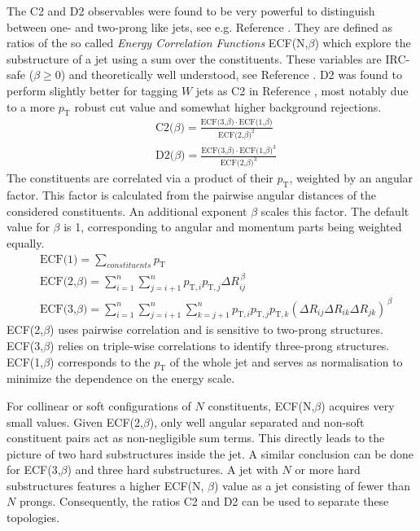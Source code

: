 The C2 and D2 observables were found to be very powerful to distinguish between one- and two-prong like jets, see e.g. Reference \cite{bib:power_counting}. They are defined as ratios of the so called \textit{Energy Correlation Functions} ECF(N,$\beta$) which explore the substructure of a jet using a sum over the constituents. These variables are IRC-safe ($\beta\ge0$) and theoretically well understood, see Reference \cite{bib:analytic_ECF}. D2 was found to perform slightly better for tagging $W$ jets as C2 in Reference \cite{bib:w_tagging}, most notably due to a more $p_{\mathrm{T}}$ robust cut value and somewhat higher background rejections. 
\begin{equation}
\begin{aligned}
 & \text{C2($\beta$)} ={} \frac{\text{ECF(3,$\beta$)}\cdot\text{ECF(1,$\beta$)}}{\text{ECF(2,$\beta$)}^2} \\ 
 & \text{D2($\beta$)} ={} \frac{\text{ECF(3,$\beta$)}\cdot\text{ECF(1,$\beta$)}^3}{\text{ECF(2,$\beta$)}^3}
\end{aligned}
\end{equation}\label{eq:C2D2} 
The constituents are correlated via a product of their $p_{\mathrm{T}}$, weighted by an angular factor. This factor is calculated from the pairwise angular distances of the considered constituents. An additional exponent $\beta$ scales this factor. The default value for $\beta$ is 1, corresponding to angular and momentum parts being weighted equally.
\begin{equation}
\begin{aligned}
 & \text{ECF(1)}  ={} \sum\limits_{constituents} p_{\mathrm{T}} \\ 
 & \text{ECF(2,$\beta$)} ={} \sum\limits_{i=1}^n \sum\limits_{j=i+1}^n p_{\mathrm{T},i}p_{\mathrm{T},j}\Delta R_{ij}^{\,\beta} \\ 
 & \text{ECF(3,$\beta$)} ={} \sum\limits_{i=1}^n \sum\limits_{j=i+1}^n \sum\limits_{k=j+1}^n p_{\mathrm{T},i}p_{\mathrm{T},j}p_{\mathrm{T},k}(\Delta R_{ij} \Delta R_{ik} \Delta R_{jk})^{\,\beta}
\end{aligned}
\end{equation}\label{eq:ECF}
ECF(2,$\beta$) uses pairwise correlation and is sensitive to two-prong structures. ECF(3,$\beta$) relies on triple-wise correlations to identify three-prong structures. ECF(1,$\beta$) corresponds to the $p_{\mathrm{T}}$ of the whole jet and serves as normalisation to minimize the dependence on the energy scale.

For collinear or soft configurations of $N$ constituents, ECF(N,$\beta$) acquires very small values. Given ECF(2,$\beta$), only well angular separated and non-soft constituent pairs act as non-negligible sum terms. This directly leads to the picture of two hard substructures inside the jet. A similar conclusion can be done for ECF(3,$\beta$) and three hard substructures. 
A jet with $N$ or more hard substructures features a higher ECF(N, $\beta$) value as a jet consisting of fewer than $N$ prongs. Consequently, the ratios C2 and D2 can be used to separate these topologies.

